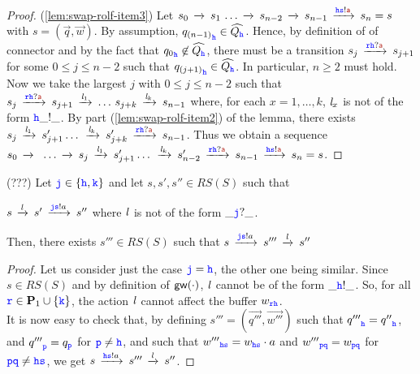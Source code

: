 \begin{proof}
(\ref{lem:swap-rolf-item3})
Let $s_0\lts{}  s_1\,\ldots \lts{} s_{n-2}  \lts{} s_{n-1}\lts{\HH\tts!\msg[a]}s_n=s$ with $s = (\vec{q},\vec{w})$.
By assumption, ${q_{(n-1)}}_{\HH}\in\widehat{Q_{\HH}}$.
Hence, by definition of of connector
 and by the fact that ${q_0}_{\HH}\not\in\widehat{Q_{\HH}}$,
 there must be a transition $s_j \lts{\ttr\HH?\msg[a]}s_{j+1}$ for
 some $0\leq j \leq n-2$ such that ${q_{(j+1)}}_\hh\in\widehat{Q_\hh}$. 
In particular, $n \geq 2$ must hold.
Now we take the largest $j$ with $0\leq j \leq n-2$ such that
 $s_j  \lts{\ttr\HH?\msg[a]} s_{j+1}\lts{\elle_1}\ldots\, s_{j+k}\lts{\elle_{k}}s_{n-1}$
 where, for each $x = 1,\ldots,k$,  $\elle_x$ is not of the form $\HH\_!\_$.
By part (\ref{lem:swap-rolf-item2}) of the lemma, there exists
 $s_j  \lts{\elle_1}s'_{j+1} \ldots\,  \lts{\elle_k} s'_{j+k} \lts{\ttr\HH?\msg[a]} s_{n-1}$. Thus we obtain a sequence
$s_0\lts{}\,\,\ldots \lts{}s_j  \lts{\elle_1}s'_{j+1} \ldots\,  \lts{\elle_k} s'_{n-2}\lts{\ttr\HH?\msg[a]}s_{n-1}\lts{\HH\tts!\msg[a]}s_n=s$.
 
 
\end{proof}



\begin{lemma}
\label{lem:swap}
(???) Let $\JJ\in\Set{\HH,\KK}$ and 
let $s,s',s''\in RS(S)$  such that\\
\centerline{$s\lts{\elle}s'\lts{\JJ\tts!a}s''$ where
$\elle$ is not of the form $\_\JJ?\_$.}
Then, there exists $s'''\in RS(S)$ such that $s\lts{\JJ\tts!a}s'''\lts{\elle}s''$
\end{lemma}

\begin{proof}
Let us consider just the case $\JJ=\HH$, the other one being similar.
Since $s\in RS(S)$ and by definition of $\gateway{\cdot}$, $\elle$ cannot be of the form $\_\HH!\_$.
So, for all $\ttr\in\roles_1\cup\Set{\KK}$, the action $\elle$ cannot affect the buffer ${w}_{\ttr\HH}$.\\
It is now easy to check that, by defining $s'''=(\vec{q'''},\vec{w'''})$ such that  
${q'''}_{\HH} = {q''}_{\HH}$,  and ${q'''}_{\ttp} = {q}_{\ttp}$ for $\ttp\neq \HH$,
and such that
${w'''}_{\HH\tts} = {w}_{\HH\tts}\cdot a$ and  ${w'''}_{\ttp\ttq} = {w}_{\ttp\ttq}$ for $\ttp\ttq\neq \HH\tts$, we get $s\lts{\HH\tts!a}s'''\lts{\elle}s''$.
\end{proof}




